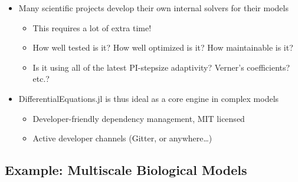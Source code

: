 \documentclass[11pt]{article}
\begin{document}
\begin{itemize}
\itemsep1pt\parskip0pt
\item
  Many scientific projects develop their own internal solvers for their
  models

  \begin{itemize}
  \itemsep1pt\parskip0pt
  \item
    This requires a lot of extra time!
  \item
    How well tested is it? How well optimized is it? How maintainable is
    it?
  \item
    Is it using all of the latest PI-stepsize adaptivity? Verner's
    coefficients? etc.?
  \end{itemize}
\item
  DifferentialEquations.jl is thus ideal as a core engine in complex
  models

  \begin{itemize}
  \itemsep1pt\parskip0pt
  \item
    Developer-friendly dependency management, MIT licensed
  \item
    Active developer channels (Gitter, or anywhere\ldots{})
  \end{itemize}
\end{itemize}

    \subsection{Example: Multiscale Biological
Models}\label{example-multiscale-biological-models}
\end{document}
